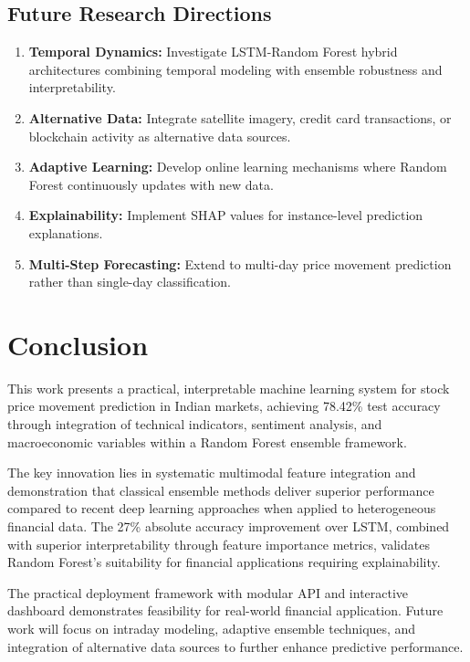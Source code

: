 \documentclass[conference]{IEEEtran}
\begin{document}
\subsection{Future Research Directions}

\begin{enumerate}
\item \textbf{Temporal Dynamics:} Investigate LSTM-Random Forest hybrid architectures combining temporal modeling with ensemble robustness and interpretability.

\item \textbf{Alternative Data:} Integrate satellite imagery, credit card transactions, or blockchain activity as alternative data sources.

\item \textbf{Adaptive Learning:} Develop online learning mechanisms where Random Forest continuously updates with new data.

\item \textbf{Explainability:} Implement SHAP values for instance-level prediction explanations.

\item \textbf{Multi-Step Forecasting:} Extend to multi-day price movement prediction rather than single-day classification.
\end{enumerate}

\section{Conclusion}

This work presents a practical, interpretable machine learning system for stock price movement prediction in Indian markets, achieving 78.42\% test accuracy through integration of technical indicators, sentiment analysis, and macroeconomic variables within a Random Forest ensemble framework. 

The key innovation lies in systematic multimodal feature integration and demonstration that classical ensemble methods deliver superior performance compared to recent deep learning approaches when applied to heterogeneous financial data. The 27\% absolute accuracy improvement over LSTM, combined with superior interpretability through feature importance metrics, validates Random Forest's suitability for financial applications requiring explainability.

The practical deployment framework with modular API and interactive dashboard demonstrates feasibility for real-world financial application. Future work will focus on intraday modeling, adaptive ensemble techniques, and integration of alternative data sources to further enhance predictive performance.
\end{document}
